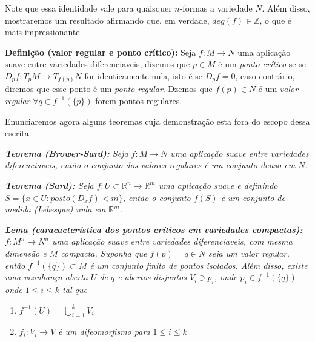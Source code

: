 \documentclass{article}
\begin{document}
	Note que essa identidade vale para quaisquer $n$-formas a variedade $N$. Além disso, mostraremos um resultado afirmando que, em verdade, $deg(f) \in \mathbb{Z}$, o que é mais impressionante.
	
	\vspace{2mm}
	\textbf{Definição (valor regular e ponto crítico):} Seja $f: M \to N$ uma aplicação suave entre variedades diferenciaveis, dizemos que $p \in M$ é um 
	\textit{ponto crítico} se se $D_{p}f : T_{p}M \to T_{f(p)}N$ for identicamente nula, isto é se $D_{p}f = 0$, caso contrário, diremos que esse ponto é um \textit{ponto regular}. Dzemos que $f(p) \in N$ é um \textit{valor regular} $\forall q \in f^{-1}(\{p\})$ forem pontos regulares.
	
	Enunciaremos agora alguns teoremas cuja demonstração esta fora do escopo dessa escrita.
	
	\vspace{2mm}
	\textit{\textbf{Teorema (Brower-Sard):} Seja $f: M \to N$ uma aplicação suave entre variedades diferenciaveis, então o conjunto dos valores regulares é um conjunto denso em $N$.}
	
	\vspace{2mm}
	\textit{\textbf{Teorema (Sard):} Seja $f: U \subset \mathbb{R}^{n} \to \mathbb{R}^{m}$ uma aplicação suave e definindo $S = \{x \in U: posto(D_{x}f) < m\}$, então o conjunto $f(S)$ é um conjunto de medida (Lebesgue) nula em $\mathbb{R}^{m}$.}
	
	\vspace{2mm}
	\textit{\textbf{Lema (caracacterística dos pontos críticos em variedades compactas):} $f: M^{n} \to N^{n}$ uma aplicação suave entre variedades diferenciaveis, com mesma dimensão e $M$ compacta. Suponha que $f(p) = q \in N$ seja um valor regular, então $f^{-1}(\{q\}) \subset M$ é um conjunto finito de pontos isolados. Além disso, existe uma vizinhança aberta $U$ de $q$ e abertos disjuntos $V_{i} \ni p_{i}$, onde $p_{i} \in f^{-1}(\{q\})$ onde $1 \leq i \leq k$ tal que}
	\begin{enumerate}
		\item $f^{-1}(U) = \bigcup \limits_{i=1}^{k} V_{i}$
		
		\item $f_{i}:V_{i} \to V$ \textit{é um difeomorfismo para} $1 \leq i \leq k$
	\end{enumerate}
	
\end{document}

